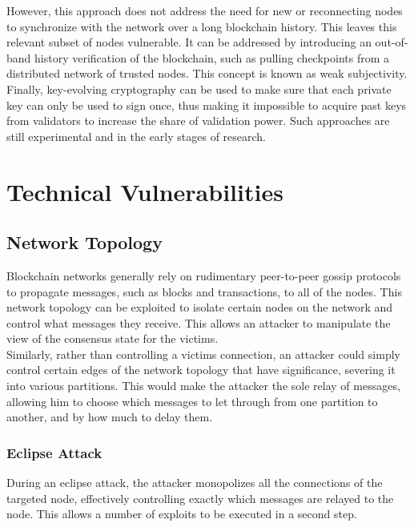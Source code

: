 \documentclass[11pt,a4paper]{article}
\begin{document}
However, this approach does not address the need for new or reconnecting nodes to synchronize with the network over a long blockchain history. This leaves this relevant subset of nodes vulnerable. It can be addressed by introducing an out-of-band history verification of the blockchain, such as pulling checkpoints from a distributed network of trusted nodes. This concept is known as weak subjectivity.\\

Finally, key-evolving cryptography can be used to make sure that each private key can only be used to sign once, thus making it impossible to acquire past keys from validators to increase the share of validation power. Such approaches are still experimental and in the early stages of research.\\

\section{Technical Vulnerabilities}

\subsection{Network Topology}

Blockchain networks generally rely on rudimentary peer-to-peer gossip protocols to propagate messages, such as blocks and transactions, to all of the nodes. This network topology can be exploited to isolate certain nodes on the network and control what messages they receive. This allows an attacker to manipulate the view of the consensus state for the victims.\\

Similarly, rather than controlling a victims connection, an attacker could simply control certain edges of the network topology that have significance, severing it into various partitions. This would make the attacker the sole relay of messages, allowing him to choose which messages to let through from one partition to another, and by how much to delay them.\\

\subsubsection{Eclipse Attack}

During an eclipse attack, the attacker monopolizes all the connections of the targeted node, effectively controlling exactly which messages are relayed to the node. This allows a number of exploits to be executed in a second step.\\
\end{document}

